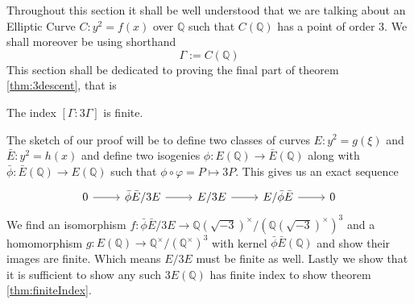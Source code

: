 Throughout this section it shall be well understood that
we are talking about an Elliptic Curve $C: y^2 = f(x)$
over $\mathbb{Q}$ such that $C(\mathbb{Q})$ has a point of order 3.
We shall moreover be using shorthand
\begin{equation*}
  \Gamma := C(\mathbb{Q})
\end{equation*}
This section shall be dedicated to proving the final part of
theorem \ref{thm:3descent}, that is
\begin{theorem} \label{thm:finiteIndex}
  The index $[\Gamma: 3\Gamma]$ is finite.
\end{theorem}
The sketch of our proof will be to define two classes
of curves $E: y^2 = g(\xi)$ and $\bar{E}: y^2 = h(x)$
and define two isogenies $\phi: E(\mathbb{Q}) \to \bar{E}(\mathbb{Q})$
along with $\bar{\phi}: \bar{E}(\mathbb{Q}) \to E(\mathbb{Q})$
such that $\phi \circ \varphi = P \mapsto 3P$.
This gives us an exact sequence
\begin{equation*}
\begin{tikzcd}
  0 \ar[r] & \bar{\phi}\bar{E}/3E \ar[r] & E/3E \ar[r] & E/\bar{\phi}\bar{E} \ar[r] & 0
\end{tikzcd}
\end{equation*}
We find an isomorphism
$f: \bar{\phi}\bar{E}/3E \to \mathbb{Q}(\sqrt{-3})^\times/(\mathbb{Q}(\sqrt{-3})^\times)^3$
and a homomorphism $g: E(\mathbb{Q}) \to \mathbb{Q}^\times/(\mathbb{Q}^\times)^3$ with kernel
$\bar{\phi}\bar{E}(\mathbb{Q})$ and show their images are finite.
Which means $E/3E$ must be finite as well.
Lastly we show that it is sufficient
to show any such $3E(\mathbb{Q})$ has
finite index to show theorem \ref{thm:finiteIndex}.
